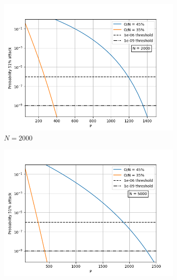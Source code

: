 \begin{figure}[H]
\centering
 \begin{subfigure}[b]{0.45\textwidth}
        \includegraphics[width=\textwidth]{Figures/Prob51_vs_P_N2000_O35_to_45}

        \renewcommand{\thesubfigure}{a}
     \caption{$N = 2000$}
        \label{fig:N2000}
    \end{subfigure}
    \begin{subfigure}[b]{0.45\textwidth}
        \includegraphics[width=\textwidth]{Figures/Prob51_vs_P_N5000_O35_to_45}
   

\end{subfigure}
\end{figure}
